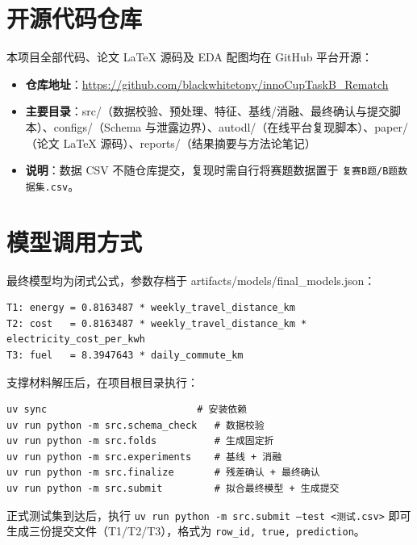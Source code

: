 \section{开源代码仓库}

本项目全部代码、论文 LaTeX 源码及 EDA 配图均在 GitHub 平台开源：

\begin{itemize}[itemsep=2pt]
\item \textbf{仓库地址}：\url{https://github.com/blackwhitetony/innoCupTaskB_Rematch}
\item \textbf{主要目录}：src/（数据校验、预处理、特征、基线/消融、最终确认与提交脚本）、configs/（Schema 与泄露边界）、autodl/（在线平台复现脚本）、paper/（论文 LaTeX 源码）、reports/（结果摘要与方法论笔记）
\item \textbf{说明}：数据 CSV 不随仓库提交，复现时需自行将赛题数据置于 \texttt{复赛B题/B题数据集.csv}。
\end{itemize}

\section{模型调用方式}

最终模型均为闭式公式，参数存档于 artifacts/models/final\_models.json：

\begin{verbatim}
T1: energy = 0.8163487 * weekly_travel_distance_km
T2: cost   = 0.8163487 * weekly_travel_distance_km * electricity_cost_per_kwh
T3: fuel   = 8.3947643 * daily_commute_km
\end{verbatim}

支撑材料解压后，在项目根目录执行：

\begin{verbatim}
uv sync                          # 安装依赖
uv run python -m src.schema_check   # 数据校验
uv run python -m src.folds          # 生成固定折
uv run python -m src.experiments    # 基线 + 消融
uv run python -m src.finalize       # 残差确认 + 最终确认
uv run python -m src.submit         # 拟合最终模型 + 生成提交
\end{verbatim}

正式测试集到达后，执行 \texttt{uv run python -m src.submit --test <测试.csv>} 即可生成三份提交文件（T1/T2/T3），格式为 \texttt{row\_id, true, prediction}。
